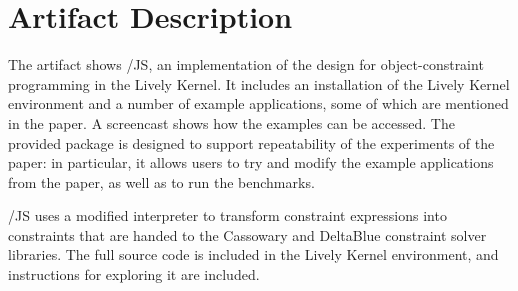 
\clearpage\section{Artifact Description}



\begin{summary}
  The artifact shows \langname/JS, an implementation of the \langname
  design for object-constraint programming in the Lively Kernel. It
  includes an installation of the Lively Kernel environment and a
  number of example applications, some of which are mentioned in the
  paper. A screencast shows how the examples can be accessed. The
  provided package is designed to support repeatability of the
  experiments of the paper: in particular, it allows users to try and
  modify the example applications from the paper, as well as to run
  the benchmarks.

  \langname/JS uses a modified \javascript interpreter to transform
  constraint expressions into constraints that are handed to the
  Cassowary and DeltaBlue constraint solver libraries. The full source
  code is included in the Lively Kernel environment, and instructions
  for exploring it are included.
\end{summary}

